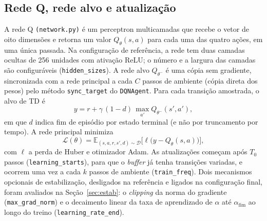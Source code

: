\documentclass[conference]{IEEEtran}
\begin{document}
\subsection{Rede Q, rede alvo e atualização}
A rede Q \texttt{(network.py)} é um perceptron multicamadas que recebe o vetor de oito dimensões e retorna um valor $Q_\theta(s,a)$ para cada uma das quatro ações, em uma única passada. Na configuração de referência, a rede tem duas camadas ocultas de 256 unidades com ativação ReLU; o número e a largura das camadas são configuráveis (\texttt{hidden\_sizes}). A rede alvo $Q_{\theta^-}$ é uma cópia sem gradiente, sincronizada com a rede principal a cada $C$ passos de ambiente (cópia direta dos pesos) pelo método \texttt{sync\_target} do \texttt{DQNAgent}. Para cada transição amostrada, o alvo de TD é
\begin{equation}
y = r + \gamma\,(1-d)\,\max_{a'} Q_{\theta^-}(s',a'),
\label{eq:target}
\end{equation}
em que $d$ indica fim de episódio por estado terminal (e não por truncamento por tempo). A rede principal minimiza
\begin{equation}
\mathcal{L}(\theta)=\mathbb{E}_{(s,a,r,s',d)\sim\mathcal{D}}\big[\ell\big(y-Q_\theta(s,a)\big)\big],
\label{eq:loss}
\end{equation}
com $\ell$ a perda de Huber e otimizador Adam. As atualizações começam após $T_0$ passos (\texttt{learning\_starts}), para que o \textit{buffer} já tenha transições variadas, e ocorrem uma vez a cada $k$ passos de ambiente (\texttt{train\_freq}). Dois mecanismos opcionais de estabilização, desligados na referência e ligados na configuração final, foram avaliados na Seção~\ref{sec:estab}: o \textit{clipping} da norma do gradiente (\texttt{max\_grad\_norm}) e o decaimento linear da taxa de aprendizado de $\alpha$ até $\alpha_{\text{fim}}$ ao longo do treino (\texttt{learning\_rate\_end}).
\end{document}
